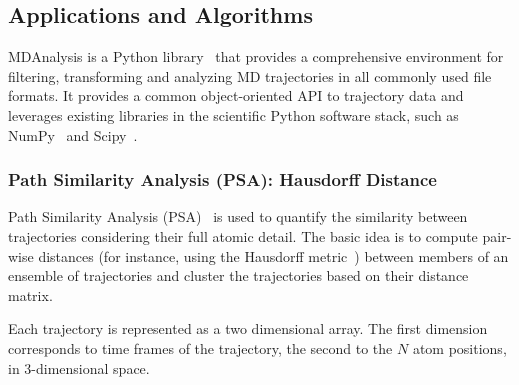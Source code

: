 

\subsection{Applications and Algorithms}
\label{ssec:mda}
MDAnalysis is a Python library~\cite{michaud2011mdanalysis,gowers2016mdanalysis} that provides a comprehensive environment for filtering, transforming and analyzing MD trajectories in all commonly used file formats.
It provides a common object-oriented API to trajectory data and leverages existing libraries in the scientific Python software stack, such as NumPy~\cite{numpy} and Scipy~\cite{scipy}.

\subsubsection*{Path Similarity Analysis (PSA): Hausdorff Distance}Path Similarity Analysis (PSA)~\cite{seyler2015path} is used to quantify the similarity between trajectories considering their full atomic detail.
The basic idea is to compute pair-wise distances (for instance, using the Hausdorff metric~\cite{huttenlocher1993comparing}) between members of an ensemble of trajectories and cluster the trajectories based on their distance matrix.

Each trajectory is represented as a two dimensional array.
The first dimension corresponds to time frames of the trajectory, the second to the $N$ atom positions, in 3-dimensional space.

